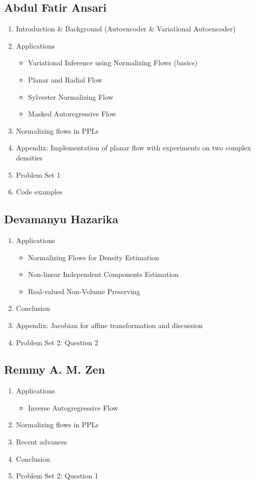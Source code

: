 \documentclass[runningheads]{llncs}
\begin{document}
\subsection*{Abdul Fatir Ansari}
\begin{enumerate}
	\item Introduction \& Background (Autoencoder \& Variational Autoencoder)
	\item Applications
	\begin{itemize}
		\item Variational Inference using Normalizing Flows (basics)
		\item Planar and Radial Flow
		\item Sylvester Normalizing Flow
		\item Masked Autoregressive Flow
	\end{itemize}
	\item Normalizing flows in PPLs
	\item Appendix: Implementation of planar flow with experiments on two complex densities
	\item Problem Set 1
	\item Code examples
\end{enumerate}

\subsection*{Devamanyu Hazarika}
\begin{enumerate}
	\item Applications
	\begin{itemize}
		\item Normalizing Flows for Density Estimation 
		\item Non-linear Independent Components Estimation
		\item Real-valued Non-Volume Preserving
	\end{itemize}
	\item Conclusion
    \item Appendix: Jacobian for affine transformation and discussion
    \item Problem Set 2: Question 2
\end{enumerate}


\subsection*{Remmy A. M. Zen}
\begin{enumerate}
	\item Applications
	\begin{itemize}
		\item Inverse Autogregressive Flow
	\end{itemize}
	\item Normalizing flows in PPLs
	\item Recent advances
	\item Conclusion
	\item Problem Set 2: Question 1
\end{enumerate}
\end{document}
